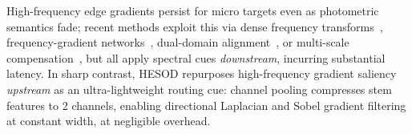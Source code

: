 High-frequency edge gradients persist for micro targets even as photometric semantics fade; recent methods exploit this via dense frequency transforms~\cite{SET}, frequency-gradient networks~\cite{Zhao2025TGRS}, dual-domain alignment~\cite{Guo2025DualDomain}, or multi-scale compensation~\cite{Wang2026HighFreq}, but all apply spectral cues \emph{downstream}, incurring substantial latency. In sharp contrast, HESOD repurposes high-frequency gradient saliency \emph{upstream} as an ultra-lightweight routing cue: channel pooling compresses stem features to 2 channels, enabling directional Laplacian and Sobel gradient filtering at constant width, at negligible overhead.


